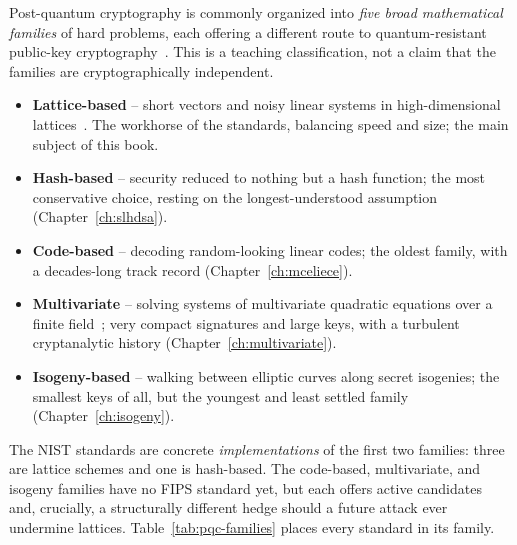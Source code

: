 Post-quantum cryptography is commonly organized into \emph{five broad mathematical families} of hard problems, each offering a different route to quantum-resistant public-key cryptography~\cite{bernstein2009}. This is a teaching classification, not a claim that the families are cryptographically independent.

\begin{itemize}
  \item \textbf{Lattice-based} -- short vectors and noisy linear systems in high-dimensional lattices~\cite{micciancioregev2009,peikert2014}. The workhorse of the standards, balancing speed and size; the main subject of this book.
  \item \textbf{Hash-based} -- security reduced to nothing but a hash function; the most conservative choice, resting on the longest-understood assumption (Chapter~\ref{ch:slhdsa}).
  \item \textbf{Code-based} -- decoding random-looking linear codes; the oldest family, with a decades-long track record (Chapter~\ref{ch:mceliece}).
  \item \textbf{Multivariate} -- solving systems of multivariate quadratic equations over a finite field~\cite{ding2006}; very compact signatures and large keys, with a turbulent cryptanalytic history (Chapter~\ref{ch:multivariate}).
  \item \textbf{Isogeny-based} -- walking between elliptic curves along secret isogenies; the smallest keys of all, but the youngest and least settled family (Chapter~\ref{ch:isogeny}).
\end{itemize}

The NIST standards are concrete \emph{implementations} of the first two families: three are lattice schemes and one is hash-based. The code-based, multivariate, and isogeny families have no FIPS standard yet, but each offers active candidates and, crucially, a structurally different hedge should a future attack ever undermine lattices. Table~\ref{tab:pqc-families} places every standard in its family.

